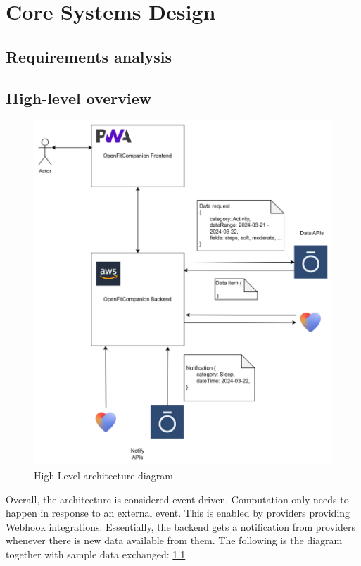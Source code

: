 \chapter{Core Systems Design}
\label{cha:core_system_design}
\section{Requirements analysis}
\section{High-level overview}
\begin{figure}
    \centering
    \includegraphics[width=\textwidth,height=\textheight,keepaspectratio]{images/highLevel.png}
    \caption{High-Level architecture diagram}
    \label{fig:1}
\end{figure}
Overall, the architecture is considered event-driven. Computation only needs to happen in response to an external event. This is enabled by providers providing Webhook integrations. Essentially, the backend gets a notification from providers whenever there is new data available from them. The following is the diagram together with sample data exchanged: \ref{fig:1}

